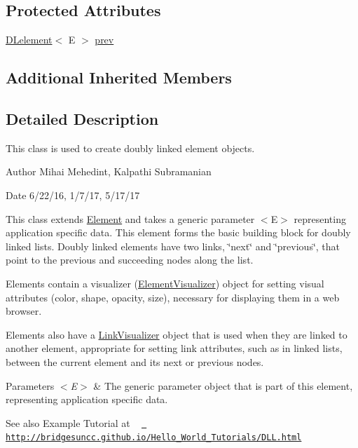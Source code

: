\subsection*{Protected Attributes}
\begin{DoxyCompactItemize}
\item 
\mbox{\hyperlink{classbridges_1_1base_1_1_d_lelement}{D\+Lelement}}$<$ E $>$ \mbox{\hyperlink{classbridges_1_1base_1_1_d_lelement_a6eba4876f820b75ac6bde01d7dea9da7}{prev}}
\end{DoxyCompactItemize}
\subsection*{Additional Inherited Members}


\subsection{Detailed Description}
This class is used to create doubly linked element objects. 

\begin{DoxyAuthor}{Author}
Mihai Mehedint, Kalpathi Subramanian
\end{DoxyAuthor}
\begin{DoxyDate}{Date}
6/22/16, 1/7/17, 5/17/17
\end{DoxyDate}
This class extends \mbox{\hyperlink{classbridges_1_1base_1_1_element}{Element}} and takes a generic parameter $<$\+E$>$ representing application specific data. This element forms the basic building block for doubly linked lists. Doubly linked elements have two links, \char`\"{}next\char`\"{} and \char`\"{}previous\char`\"{}, that point to the previous and succeeding nodes along the list.

Elements contain a visualizer (\mbox{\hyperlink{classbridges_1_1base_1_1_element_visualizer}{Element\+Visualizer}}) object for setting visual attributes (color, shape, opacity, size), necessary for displaying them in a web browser.

Elements also have a \mbox{\hyperlink{classbridges_1_1base_1_1_link_visualizer}{Link\+Visualizer}} object that is used when they are linked to another element, appropriate for setting link attributes, such as in linked lists, between the current element and its next or previous nodes.


\begin{DoxyParams}{Parameters}
{\em $<$\+E$>$} & The generic parameter object that is part of this element, representing application specific data.\\
\hline
\end{DoxyParams}
\begin{DoxySeeAlso}{See also}
Example Tutorial at ~\newline
 \href{http://bridgesuncc.github.io/Hello_World_Tutorials/DLL.html}{\texttt{ http\+://bridgesuncc.\+github.\+io/\+Hello\+\_\+\+World\+\_\+\+Tutorials/\+D\+L\+L.\+html}} 
\end{DoxySeeAlso}


